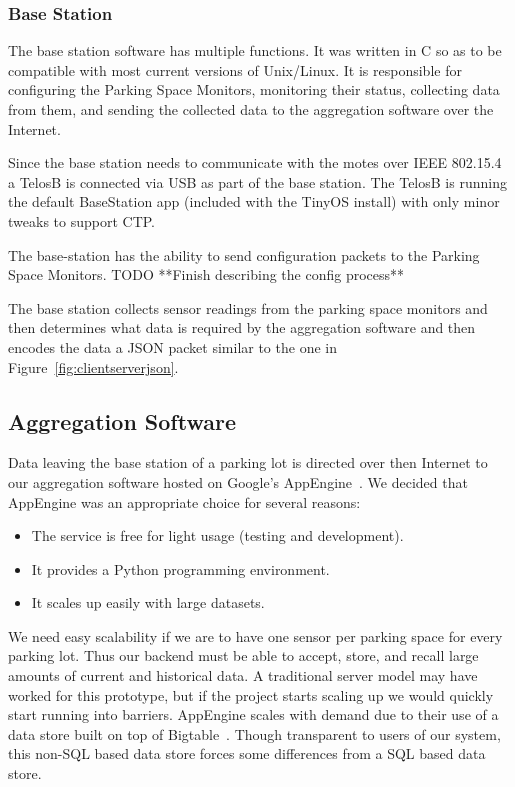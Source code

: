 \documentclass{acm_proc}
\begin{document}
\subsubsection{Base Station}

The base station software has multiple functions.  It was written in C so
as to be compatible with most current versions of Unix/Linux.
It is responsible for configuring the Parking Space Monitors, monitoring their status, collecting data from them, and sending the collected data to the aggregation software over the Internet.

Since the base station needs to communicate with the motes over IEEE
802.15.4 a TelosB is connected via USB as part of the base station.
The TelosB is running the default BaseStation app (included with the TinyOS
install) with only minor tweaks to support CTP.

The base-station has the ability to send configuration packets to the
Parking Space Monitors.  TODO **Finish describing the config process**

The base station collects sensor readings from the parking space monitors
and then determines what data is required by the aggregation software and
then encodes the data a JSON packet similar to the one in
Figure~\ref{fig:clientserverjson}.

\subsection{Aggregation Software}

Data leaving the base station of a parking lot is directed over then
Internet to our aggregation software hosted on Google's
AppEngine~\cite{google:appengine}.
We decided that AppEngine was an appropriate choice for several reasons:
\begin{itemize}
	\item The service is free for light usage (testing and development).
	\item It provides a Python programming environment.
	\item It scales up easily with large datasets.
\end{itemize}

We need easy scalability if we are to have one sensor per parking space for
every parking lot.
Thus our backend must be able to accept, store, and recall large amounts of
current and historical data.
A traditional server model may have worked for this prototype, but if the
project starts scaling up we would quickly start running into barriers.
AppEngine scales with demand due to their use of a data store built on top
of Bigtable~\cite{google:bigtable}.
Though transparent to users of our system, this non-SQL based data store
forces some differences from a SQL based data store.
\end{document}
